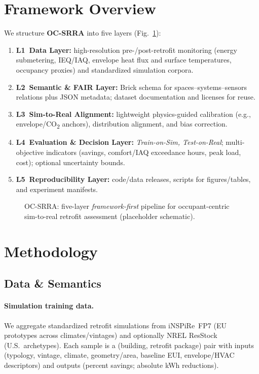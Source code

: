 \documentclass{article}
\begin{document}
\section{Framework Overview}
We structure \textbf{OC-SRRA} into five layers (Fig.~\ref{fig:framework}):

\begin{enumerate}
  \item \textbf{L1~Data Layer:} high-resolution pre-/post-retrofit monitoring (energy submetering, IEQ/IAQ, envelope heat flux and surface temperatures, occupancy proxies) and standardized simulation corpora.
  \item \textbf{L2~Semantic \& FAIR Layer:} Brick schema for spaces--systems--sensors relations plus JSON metadata; dataset documentation and licenses for reuse.
  \item \textbf{L3~Sim-to-Real Alignment:} lightweight physics-guided calibration (e.g., envelope/CO\textsubscript{2} anchors), distribution alignment, and bias correction.
  \item \textbf{L4~Evaluation \& Decision Layer:} \emph{Train-on-Sim, Test-on-Real}; multi-objective indicators (savings, comfort/IAQ exceedance hours, peak load, cost); optional uncertainty bounds.
  \item \textbf{L5~Reproducibility Layer:} code/data releases, scripts for figures/tables, and experiment manifests.
\end{enumerate}

\begin{figure}[t]
  \centering
  \fbox{\rule[-.5cm]{0pt}{4.0cm}\rule[-.5cm]{12.5cm}{0pt}}
  \caption{OC-SRRA: five-layer \emph{framework-first} pipeline for occupant-centric sim-to-real retrofit assessment (placeholder schematic).}
  \label{fig:framework}
\end{figure}

\section{Methodology}

\subsection{Data \& Semantics}
\label{sec:data}
\paragraph{Simulation training data.}
We aggregate standardized retrofit simulations from iNSPiRe~FP7 (EU prototypes across climates/vintages) and optionally NREL ResStock (U.S.\ archetypes). 
Each sample is a (building, retrofit package) pair with inputs (typology, vintage, climate, geometry/area, baseline EUI, envelope/HVAC descriptors) and outputs (percent savings; absolute kWh reductions).
\end{document}
